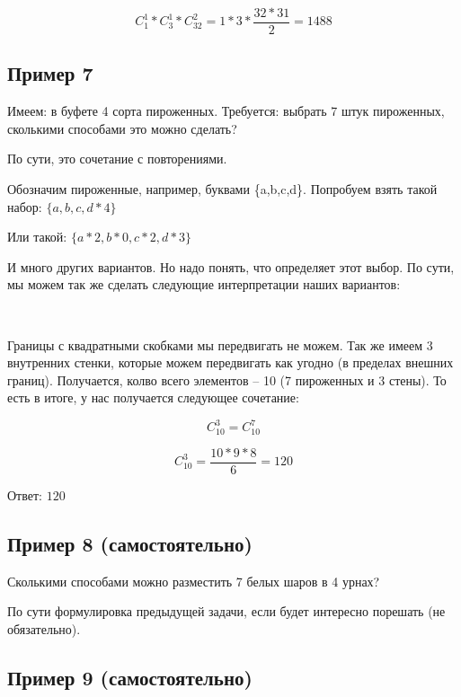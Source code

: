 \documentclass{article}
\begin{document}
$$ C_1^1 * C_3^1 * C_{32}^2 = 1 * 3 * \frac{32 * 31}{2} = 1488$$

\subsection{Пример 7}

Имеем: в буфете 4 сорта пироженных.
Требуется: выбрать 7 штук пироженных, сколькими способами это можно сделать?

По сути, это сочетание с повторениями.

Обозначим пироженные, например, буквами \{a,b,c,d\}. Попробуем взять такой набор: $\{a, b, c, d * 4\}$

Или такой: $\{a * 2, b * 0, c * 2, d * 3\}$

И много других вариантов. Но надо понять, что определяет этот выбор. По сути, мы можем так же сделать следующие интерпретации наших вариантов:

\begin{center}
\begin{tabbing}
\qquad\qquad\qquad\qquad[\quad*\quad|\quad*\quad|\quad*\quad|\quad****\quad]\\

\qquad\qquad\qquad\qquad[\quad**\quad|\qquad|\quad**\quad|\quad***\quad]
\end{tabbing}
\end{center}

Границы с квадратными скобками мы передвигать не можем. Так же имеем 3 внутренних стенки, которые можем передвигать как угодно (в пределах внешних границ). Получается, колво всего элементов -- 10 (7 пироженных и 3 стены). То есть в итоге, у нас получается следующее сочетание:

$$C_{10}^3 = C_{10}^7$$

$$C_{10}^3 = \frac{10 * 9 * 8}{6} = 120$$

Ответ: $120$

\subsection{Пример 8 (самостоятельно)}

Сколькими способами можно разместить 7 белых шаров в 4 урнах?

По сути формулировка предыдущей задачи, если будет интересно порешать (не обязательно).

\subsection{Пример 9 (самостоятельно)}
\end{document}
